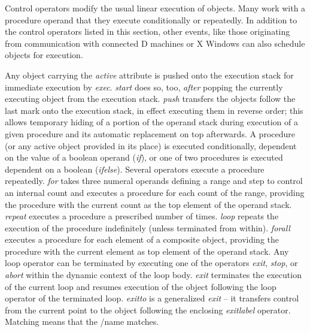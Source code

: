

Control operators modify the usual linear execution of objects. Many work with a procedure operand that they execute conditionally or repeatedly. In addition to the control operators listed in this section, other events, like those originating from communication with connected D machines or X Windows can also schedule objects for execution.

Any object carrying the \emph{active} attribute is pushed onto the
execution stack for immediate execution by \emph{exec}. \emph{start}
does so, too, \emph{after} popping the currently executing object from
the execution stack. \emph{push} transfers the objects follow the last
mark onto the execution stack, in effect executing them in reverse
order; this allows temporary hiding of a portion of the operand stack
during execution of a given procedure and its automatic replacement on
top afterwards. A procedure (or any active object provided in its
place) is executed conditionally, dependent on the value of a boolean
operand (\emph{if}), or one of two procedures is executed dependent on
a boolean (\emph{ifelse}). Several operators execute a procedure
repeatedly. \emph{for} takes three numeral operands defining a range
and step to control an internal count and executes a procedure for
each count of the range, providing the procedure with the current
count as the top element of the operand stack. \emph{repeat} executes
a procedure a prescribed number of times. \emph{loop} repeats the
execution of the procedure indefinitely (unless terminated from
within). \emph{forall} executes a procedure for each element of a
composite object, providing the procedure with the current element as
top element of the operand stack. Any loop operator can be terminated
by executing one of the operators \emph{exit}, \emph{stop}, or
\emph{abort} within the dynamic context of the loop body. \emph{exit}
terminates the execution of the current loop and resumes execution of
the object following the loop operator of the terminated
loop. \emph{exitto} is a generalized \emph{exit} -- it transfers
control from the current point to the object following the enclosing
\emph{exitlabel} operator. Matching means that the /name matches.

